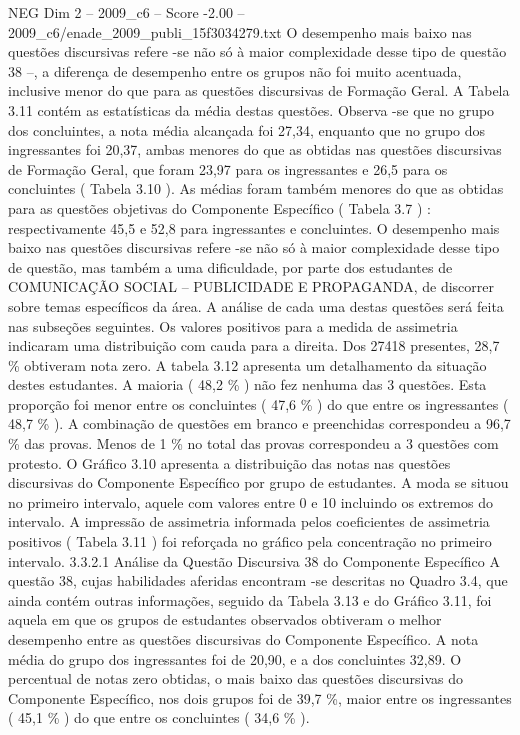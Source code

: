 \begin{textsample}{NEG Dim 2 – 2009\_c6 – Score -2.00 – 2009\_c6/enade\_2009\_publi\_15f3034279.txt}
O desempenho mais baixo nas questões discursivas refere -se não só à maior complexidade desse tipo de questão 38 –, a diferença de desempenho entre os grupos não foi muito acentuada, inclusive menor do que para as questões discursivas de Formação Geral.
A Tabela 3.11 contém as estatísticas da média destas questões.
Observa -se que no grupo dos concluintes, a nota média alcançada foi 27,34, enquanto que no grupo dos ingressantes foi 20,37, ambas menores do que as obtidas nas questões discursivas de Formação Geral, que foram 23,97 para os ingressantes e 26,5 para os concluintes ( Tabela 3.10 ).
As médias foram também menores do que as obtidas para as questões objetivas do Componente Específico ( Tabela 3.7 ) : respectivamente 45,5 e 52,8 para ingressantes e concluintes.
O desempenho mais baixo nas questões discursivas refere -se não só à maior complexidade desse tipo de questão, mas também a uma dificuldade, por parte dos estudantes de COMUNICAÇÃO SOCIAL – PUBLICIDADE E PROPAGANDA, de discorrer sobre temas específicos da área.
A análise de cada uma destas questões será feita nas subseções seguintes.
Os valores positivos para a medida de assimetria indicaram uma distribuição com cauda para a direita.
Dos 27418 presentes, 28,7 \% obtiveram nota zero.
A tabela 3.12 apresenta um detalhamento da situação destes estudantes.
A maioria ( 48,2 \% ) não fez nenhuma das 3 questões.
Esta proporção foi menor entre os concluintes ( 47,6 \% ) do que entre os ingressantes ( 48,7 \% ).
A combinação de questões em branco e preenchidas correspondeu a 96,7 \% das provas.
Menos de 1 \% no total das provas correspondeu a 3 questões com protesto.
O Gráfico 3.10 apresenta a distribuição das notas nas questões discursivas do Componente Específico por grupo de estudantes.
A moda se situou no primeiro intervalo, aquele com valores entre 0 e 10 incluindo os extremos do intervalo.
A impressão de assimetria informada pelos coeficientes de assimetria positivos ( Tabela 3.11 ) foi reforçada no gráfico pela concentração no primeiro intervalo. 3.3.2.1 Análise da Questão Discursiva 38 do Componente Específico A questão 38, cujas habilidades aferidas encontram -se descritas no Quadro 3.4, que ainda contém outras informações, seguido da Tabela 3.13 e do Gráfico 3.11, foi aquela em que os grupos de estudantes observados obtiveram o melhor desempenho entre as questões discursivas do Componente Específico.
A nota média do grupo dos ingressantes foi de 20,90, e a dos concluintes 32,89.
O percentual de notas zero obtidas, o mais baixo das questões discursivas do Componente Específico, nos dois grupos foi de 39,7 \%, maior entre os ingressantes ( 45,1 \% ) do que entre os concluintes ( 34,6 \% ).

\end{textsample}
